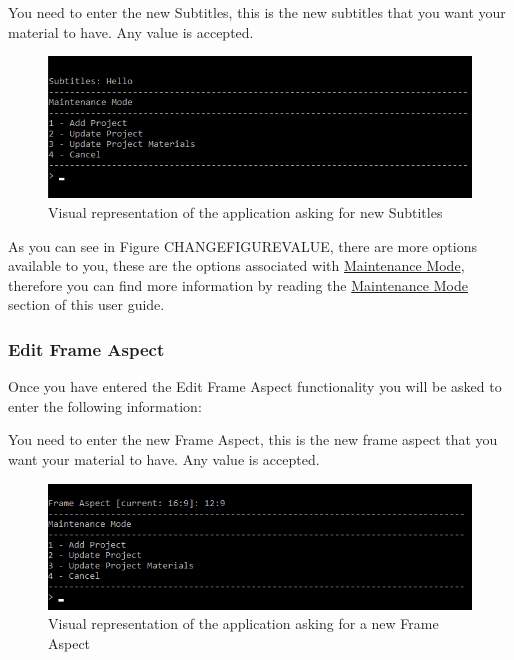 \documentclass[
  english,
  a4paper,
,tablecaptionabove
]{scrartcl}
\begin{document}
You need to enter the new Subtitles, this is the new subtitles that you
want your material to have. Any value is accepted.

\begin{figure}
\centering
\includegraphics{images/user-guide/maintenance-mode/update-project-material-subtitles.png}
\caption{Visual representation of the application asking for new
Subtitles}
\end{figure}

As you can see in Figure CHANGEFIGUREVALUE, there are more options
available to you, these are the options associated with
\protect\hyperlink{using-maintenance-mode}{Maintenance Mode}, therefore
you can find more information by reading the
\protect\hyperlink{using-maintenance-mode}{Maintenance Mode} section of
this user guide.

\newpage

\hypertarget{edit-frame-aspect-1}{%
\subsubsection{Edit Frame Aspect}\label{edit-frame-aspect-1}}

Once you have entered the Edit Frame Aspect functionality you will be
asked to enter the following information:

You need to enter the new Frame Aspect, this is the new frame aspect
that you want your material to have. Any value is accepted.

\begin{figure}
\centering
\includegraphics{images/user-guide/maintenance-mode/update-project-material-frame-aspect.png}
\caption{Visual representation of the application asking for a new Frame
Aspect}
\end{figure}
\end{document}
